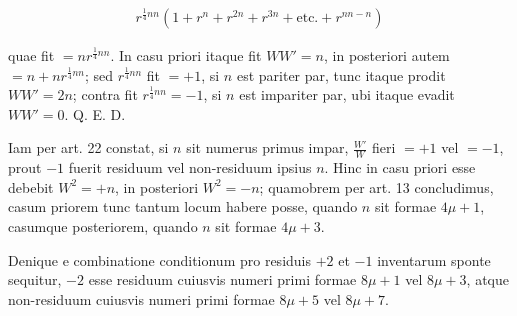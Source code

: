 %
\[
\begin{aligned}
r^{\frac14nn}(1+r^n+r^{2n}+r^{3n}+\text{etc.}+r^{nn-n})
\end{aligned}
\]

quae fit $=nr^{\frac14nn}$. In casu priori itaque fit $WW'=n$, in posteriori autem $=n+nr^{\frac14nn}$; sed $r^{\frac14nn}$ fit $=+1$, si $n$ est pariter par, tunc itaque prodit $WW'=2n$; contra fit $r^{\frac14nn}=-1$, si $n$ est impariter par, ubi itaque evadit $WW'=0$. Q. E. D.


Iam per art. 22 constat, si $n$ sit numerus primus impar, $\frac{W'}{W}$ fieri $=+1$ vel $=-1$, prout $-1$ fuerit residuum vel non-residuum ipsius $n$. Hinc in casu priori esse debebit $W^2=+n$, in posteriori $W^2=-n$; quamobrem per art. 13 concludimus, casum priorem tunc tantum locum habere posse, quando $n$ sit formae $4\mu+1$, casumque posteriorem, quando $n$ sit formae $4\mu+3$.

Denique e combinatione conditionum pro residuis $+2$ et $-1$ inventarum sponte sequitur, $-2$ esse residuum cuiusvis numeri primi formae $8\mu+1$ vel $8\mu+3$, atque non-residuum cuiusvis numeri primi formae $8\mu+5$ vel $8\mu+7$.

\BookRule{42mm}

